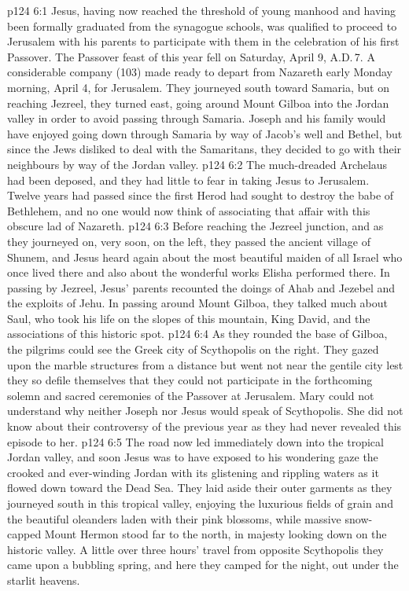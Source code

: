 \vs p124 6:1 Jesus, having now reached the threshold of young manhood and having been formally graduated from the synagogue schools, was qualified to proceed to Jerusalem with his parents to participate with them in the celebration of his first Passover. The Passover feast of this year fell on Saturday, April 9, A.D.\,7. A considerable company (103) made ready to depart from Nazareth early Monday morning, April 4, for Jerusalem. They journeyed south toward Samaria, but on reaching Jezreel, they turned east, going around Mount Gilboa into the Jordan valley in order to avoid passing through Samaria. Joseph and his family would have enjoyed going down through Samaria by way of Jacob’s well and Bethel, but since the Jews disliked to deal with the Samaritans, they decided to go with their neighbours by way of the Jordan valley.
\vs p124 6:2 The much\hyp{}dreaded Archelaus had been deposed, and they had little to fear in taking Jesus to Jerusalem. Twelve years had passed since the first Herod had sought to destroy the babe of Bethlehem, and no one would now think of associating that affair with this obscure lad of Nazareth.
\vs p124 6:3 Before reaching the Jezreel junction, and as they journeyed on, very soon, on the left, they passed the ancient village of Shunem, and Jesus heard again about the most beautiful maiden of all Israel who once lived there and also about the wonderful works Elisha performed there. In passing by Jezreel, Jesus’ parents recounted the doings of Ahab and Jezebel and the exploits of Jehu. In passing around Mount Gilboa, they talked much about Saul, who took his life on the slopes of this mountain, King David, and the associations of this historic spot.
\vs p124 6:4 As they rounded the base of Gilboa, the pilgrims could see the Greek city of Scythopolis on the right. They gazed upon the marble structures from a distance but went not near the gentile city lest they so defile themselves that they could not participate in the forthcoming solemn and sacred ceremonies of the Passover at Jerusalem. Mary could not understand why neither Joseph nor Jesus would speak of Scythopolis. She did not know about their controversy of the previous year as they had never revealed this episode to her.
\vs p124 6:5 The road now led immediately down into the tropical Jordan valley, and soon Jesus was to have exposed to his wondering gaze the crooked and ever\hyp{}winding Jordan with its glistening and rippling waters as it flowed down toward the Dead Sea. They laid aside their outer garments as they journeyed south in this tropical valley, enjoying the luxurious fields of grain and the beautiful oleanders laden with their pink blossoms, while massive snow\hyp{}capped Mount Hermon stood far to the north, in majesty looking down on the historic valley. A little over three hours’ travel from opposite Scythopolis they came upon a bubbling spring, and here they camped for the night, out under the starlit heavens.
